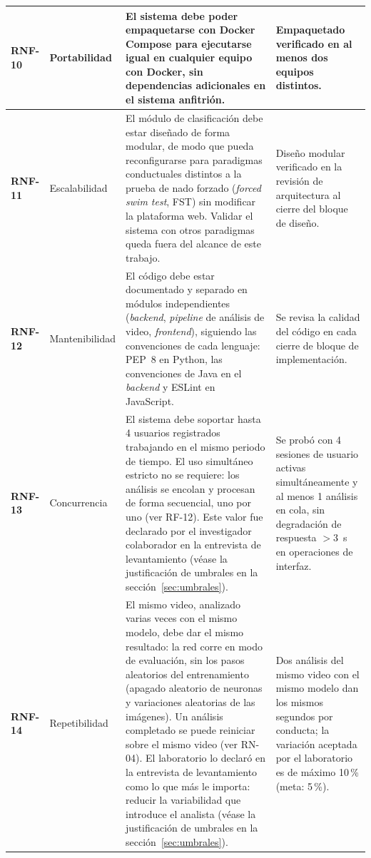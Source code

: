 \begin{longtable}{|>{\bfseries}p{1.2cm}|>{\raggedright}p{2.9cm}|>{\raggedright}p{5.2cm}|>{\raggedright\arraybackslash}p{3.8cm}|}
\hline
RNF-10 & Portabilidad
       & El sistema debe poder empaquetarse con Docker Compose para ejecutarse igual
         en cualquier equipo con Docker, sin dependencias adicionales en el sistema
         anfitrión.
       & Empaquetado verificado en al menos dos equipos distintos. \\
\hline
RNF-11 & Escalabilidad
       & El módulo de clasificación debe estar diseñado de forma modular, de modo que
         pueda reconfigurarse para paradigmas conductuales distintos a la prueba de nado forzado (\textit{forced swim test}, FST) sin
         modificar la plataforma web. Validar el sistema con otros paradigmas queda fuera
         del alcance de este trabajo.
       & Diseño modular verificado en la revisión de arquitectura al cierre
         del bloque de diseño. \\
\hline
RNF-12 & Mantenibilidad
       & El código debe estar documentado y separado en módulos independientes
         (\textit{backend}, \textit{pipeline} de análisis de video, \textit{frontend}), siguiendo las convenciones de cada lenguaje: PEP~8 en Python, las
         convenciones de Java en el \textit{backend} y ESLint en JavaScript.
       & Se revisa la calidad del código en cada cierre de bloque de
         implementación. \\
\hline
RNF-13 & Concurrencia
       & El sistema debe soportar hasta 4 usuarios registrados trabajando en el
         mismo periodo de tiempo. El uso simultáneo estricto no se requiere: los
         análisis se encolan y procesan de forma secuencial, uno por uno (ver RF-12). Este valor
         fue declarado por el investigador colaborador en la entrevista de
         levantamiento (véase la justificación de umbrales en la
         sección~\ref{sec:umbrales}).
       & Se probó con 4 sesiones de usuario activas simultáneamente y al menos 1
         análisis en cola, sin degradación de respuesta $> 3$~s en operaciones
         de interfaz. \\
\hline
RNF-14 & Repetibilidad
       & El mismo video, analizado varias veces con el mismo modelo, debe dar el mismo
         resultado: la red corre en modo de evaluación, sin los pasos aleatorios del
         entrenamiento (apagado aleatorio de neuronas y variaciones aleatorias de las
         imágenes). Un análisis completado se puede reiniciar sobre el mismo video (ver RN-04). El
         laboratorio lo declaró en la entrevista de levantamiento como lo que más le importa:
         reducir la variabilidad que introduce el analista (véase la justificación de umbrales
         en la sección~\ref{sec:umbrales}).
       & Dos análisis del mismo video con el mismo modelo dan los mismos segundos por
         conducta; la variación aceptada por el laboratorio es de máximo 10\,\% (meta:
         5\,\%). \\
\hline

\end{longtable}

